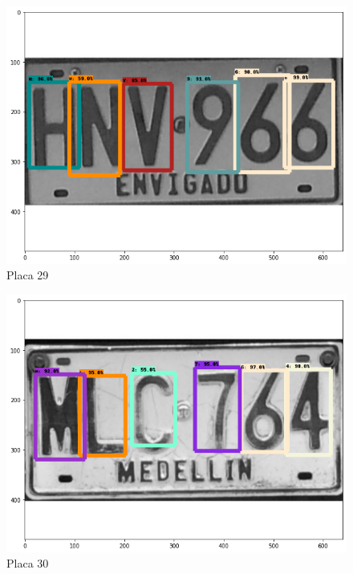 
\begin{figure}[H]
\centering
\includegraphics[width=0.4\linewidth]{imagenes/caracteres detectados/nuevo entrenamiento/14.png}
\caption{Placa 29}
\label{fig:caracteres detectados p20}
\end{figure}

\begin{table}[H]
    \centering
    \caption{Detección de caracteres con porcentajes de acierto placa 29}
    \label{tab:p20}
\end{table}

\begin{figure}[H]
\centering
\includegraphics[width=0.4\linewidth]{imagenes/caracteres detectados/12.png}
\caption{Placa 30}
\label{fig:caracteres detectados p12}
\end{figure}

